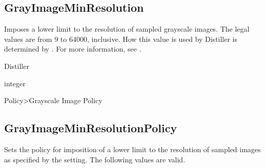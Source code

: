 \documentclass[letterpaper,12pt,english,openany,oneside]{sphinxmanual}
\begin{document}
\begin{sphinxVerbatim}[commandchars=\\\{\}]
\end{sphinxVerbatim}




\subsection{GrayImageMinResolution}
\label{\detokenize{PDF_Create_CommonSettings:grayimageminresolution}}
Imposes a lower limit to the resolution of sampled grayscale images. The legal values are from 9 to 64000, inclusive. How this value is used by Distiller is determined by  . For more information, see .

\label{\detokenize{PDF_Create_CommonSettings:supported-by-49}}

Distiller

\label{\detokenize{PDF_Create_CommonSettings:type-49}}

integer

\label{\detokenize{PDF_Create_CommonSettings:ui-name-36}}

Policy\sphinxhyphen{}>Grayscale Image Policy

\label{\detokenize{PDF_Create_CommonSettings:default-value-45}}

\begin{sphinxVerbatim}[commandchars=\\\{\}]
\end{sphinxVerbatim}




\subsection{GrayImageMinResolutionPolicy}
\label{\detokenize{PDF_Create_CommonSettings:grayimageminresolutionpolicy}}
Sets the policy for imposition of a lower limit to the resolution of sampled images as specified by the  setting. The following values are valid.
\end{document}
